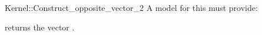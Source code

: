 \begin{ccRefFunctionObjectConcept}{Kernel::Construct_opposite_vector_2}
A model for this must provide:


{returns the vector .}

\ccIsModel{}

\end{ccRefFunctionObjectConcept}
